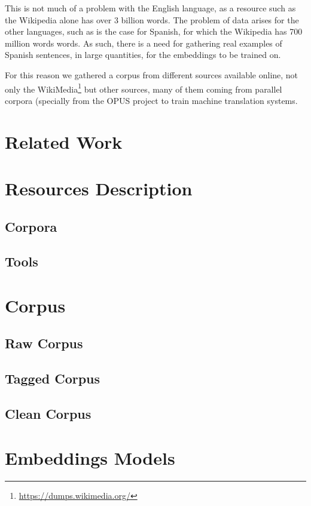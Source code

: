 \documentclass{article}
\begin{document}
This is not much of a problem with the English language, as a resource such as the Wikipedia alone
has over 3 billion words. The problem of data arises for the other languages, such as is the case for
Spanish, for which the Wikipedia has 700 million words words. As such, there is a need for gathering
real examples of Spanish sentences, in large quantities, for the embeddings to be trained on.

For this reason we gathered a corpus from different sources available online, not only the 
WikiMedia\footnote{\url{https://dumps.wikimedia.org/}} but other sources, many of them coming from parallel corpora 
(specially from the OPUS project \cite{TIEDEMANN12.463}  to train machine translation
systems.

\section{Related Work}

\section{Resources Description}

\subsection{Corpora}

\subsection{Tools}

\section{Corpus}

\subsection{Raw Corpus}

\subsection{Tagged Corpus}

\subsection{Clean Corpus}

\section{Embeddings Models}
\end{document}
